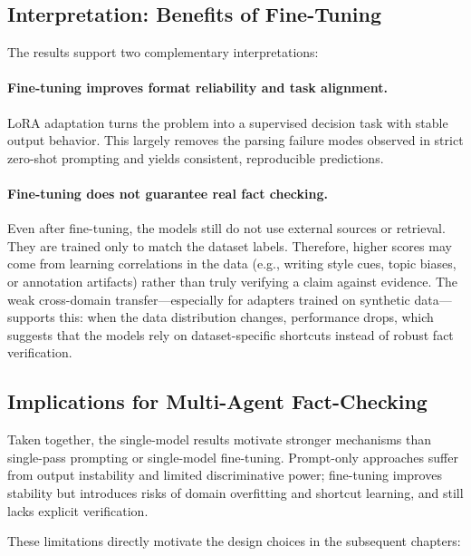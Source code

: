 \subsection{Interpretation: Benefits of Fine-Tuning}

The results support two complementary interpretations:

\paragraph{Fine-tuning improves format reliability and task alignment.}
LoRA adaptation turns the problem into a supervised decision task with stable output behavior. This largely removes the parsing failure modes observed in strict zero-shot prompting and yields consistent, reproducible predictions.

\paragraph{Fine-tuning does not guarantee real fact checking.}
Even after fine-tuning, the models still do not use external sources or retrieval. They are trained only to match the dataset labels. Therefore, higher scores may come from learning correlations in the data (e.g., writing style cues, topic biases, or annotation artifacts) rather than truly verifying a claim against evidence. The weak cross-domain transfer—especially for adapters trained on synthetic data—supports this: when the data distribution changes, performance drops, which suggests that the models rely on dataset-specific shortcuts instead of robust fact verification.

\subsection{Implications for Multi-Agent Fact-Checking}

Taken together, the single-model results motivate stronger mechanisms than single-pass prompting or single-model fine-tuning. Prompt-only approaches suffer from output instability and limited discriminative power; fine-tuning improves stability but introduces risks of domain overfitting and shortcut learning, and still lacks explicit verification.

These limitations directly motivate the design choices in the subsequent chapters:


